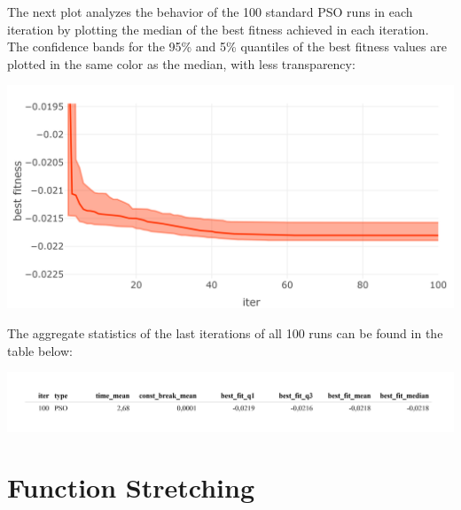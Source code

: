 \documentclass[
  oneside]{book}
\begin{document}
The next plot analyzes the behavior of the 100 standard PSO runs in each iteration by plotting the median of the best fitness achieved in each iteration. The confidence bands for the 95\% and 5\% quantiles of the best fitness values are plotted in the same color as the median, with less transparency:

\includegraphics{Master_Thesis_files/figure-latex/variants1-1.png}

The aggregate statistics of the last iterations of all 100 runs can be found in the table below:

\includegraphics{Master_Thesis_files/figure-latex/variants2-1.png}

\hypertarget{function-stretching}{%
\section{Function Stretching}\label{function-stretching}}
\end{document}
